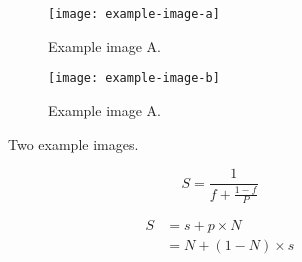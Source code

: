 \documentclass[12pt]{article}
\begin{document}
\begin{figure}[H]
     \centering
     \begin{subfigure}[b]{0.45\textwidth}
         \centering
         \texttt{[image: example-image-a]}
         \caption{Example image A.}
         \label{fig:example-image-a-side}
     \end{subfigure}
     \hfill
     \begin{subfigure}[b]{0.45\textwidth}
         \centering
         \texttt{[image: example-image-b]}
         \caption{Example image A.}
         \label{fig:example-image-b-side}
     \end{subfigure}
     \caption{Two example images.}
     \label{fig:side-by-side}
\end{figure}

\begin{equation}
    S = \frac{1}{f + \frac{1-f}{P}}
    \label{eq:amdahls-law}
\end{equation}

\begin{align}
    S &= s + p \times N \\
      &= N + (1 - N) \times s \label{eq:gustafsons-law}
\end{align}

\printbibliography[heading=bibnumbered]
\appendix
\end{document}
